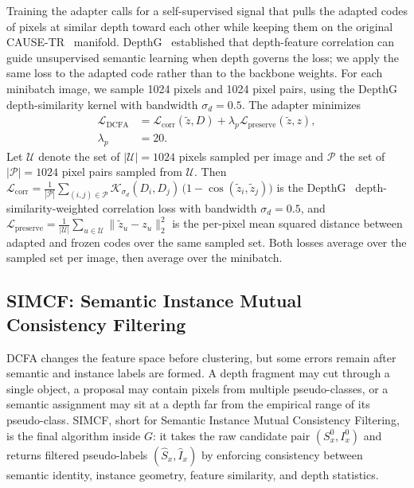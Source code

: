 \documentclass{article}
\newcounter{algorithm}
\begin{document}
Training the adapter calls for a self-supervised signal that pulls the adapted codes of pixels at similar depth toward each other while keeping them on the original CAUSE-TR~\cite{kim2024cause} manifold. DepthG~\cite{sick2024depthg} established that depth-feature correlation can guide unsupervised semantic learning when depth governs the loss; we apply the same loss to the adapted code rather than to the backbone weights. For each minibatch image, we sample 1024 pixels and 1024 pixel pairs, using the DepthG~\cite{sick2024depthg} depth-similarity kernel with bandwidth $\sigma_d = 0.5$. The adapter minimizes
\begin{equation}
\begin{aligned}
\mathcal{L}_\text{DCFA}
&= \mathcal{L}_\text{corr}(\tilde z, D)
 + \lambda_p \mathcal{L}_\text{preserve}(\tilde z, z), \\
\lambda_p &= 20 .
\end{aligned}
\label{eq:dcfa_loss}
\end{equation}
Let $\mathcal{U}$ denote the set of $|\mathcal{U}| = 1024$ pixels sampled per image and $\mathcal{P}$ the set of $|\mathcal{P}| = 1024$ pixel pairs sampled from $\mathcal{U}$. Then $\mathcal{L}_\text{corr} = \frac{1}{|\mathcal{P}|} \sum_{(i,j) \in \mathcal{P}} \mathcal{K}_{\sigma_d}(D_i, D_j)\,\big(1 - \cos(\tilde z_i, \tilde z_j)\big)$ is the DepthG~\cite{sick2024depthg} depth-similarity-weighted correlation loss with bandwidth $\sigma_d = 0.5$, and $\mathcal{L}_\text{preserve} = \frac{1}{|\mathcal{U}|} \sum_{u \in \mathcal{U}} \|\tilde z_u - z_u\|_2^2$ is the per-pixel mean squared distance between adapted and frozen codes over the same sampled set. Both losses average over the sampled set per image, then average over the minibatch.
\subsection{SIMCF: Semantic Instance Mutual Consistency Filtering}
\label{sec:method:simcf}

DCFA changes the feature space before clustering, but some errors remain after semantic and instance labels are formed. A depth fragment may cut through a single object, a proposal may contain pixels from multiple pseudo-classes, or a semantic assignment may sit at a depth far from the empirical range of its pseudo-class. SIMCF, short for Semantic Instance Mutual Consistency Filtering, is the final algorithm inside $G$: it takes the raw candidate pair $(S_x^0, I_x^0)$ and returns filtered pseudo-labels $(\hat S_x, \hat I_x)$ by enforcing consistency between semantic identity, instance geometry, feature similarity, and depth statistics.
\end{document}
